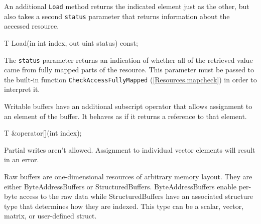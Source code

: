 An additional \texttt{Load} method returns the indicated element just as the other,
but also takes a second \texttt{status} parameter that returns information about the accessed resource.
\begin{HLSL}
 T Load(in int index, out uint status) const;
\end{HLSL}

The \texttt{status} parameter returns an indication of whether all of the retrieved value
came from fully mapped parts of the resource.
This parameter must be passed to the built-in function \texttt{CheckAccessFullyMapped} (\ref{Resources.mapcheck})
in order to interpret it.

Writable buffers have an additional subscript operator that allows assignment to an element of the buffer.
It behaves as if it returns a reference to that element.
\begin{HLSL}
 T &operator[](int index);
\end{HLSL}

Partial writes aren't allowed.
Assignment to individual vector elements will result in an error.


Raw buffers are one-dimensional resources of arbitrary memory layout.
They are either ByteAddressBuffers or StructuredBuffers.
ByteAddressBuffers enable per-byte access to the raw data while
StructuredBuffers have an associated structure type that determines how they are
indexed. This type can be a scalar, vector, matrix, or user-defined struct.


